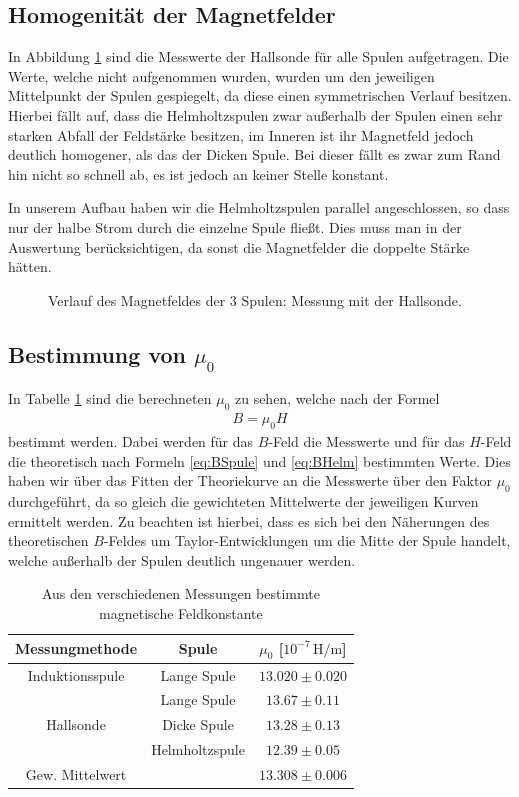 \documentclass[12pt,a4paper,titlepage,headinclude,bibtotoc]{scrartcl}
\begin{document}
\subsection{Homogenität der Magnetfelder}
In Abbildung \ref{fig:Homogen} sind die Messwerte der Hallsonde für alle Spulen aufgetragen.
Die Werte, welche nicht aufgenommen wurden, wurden um den jeweiligen Mittelpunkt der Spulen gespiegelt, da diese einen symmetrischen Verlauf besitzen.
Hierbei fällt auf, dass die Helmholtzspulen zwar außerhalb der Spulen einen sehr starken Abfall der Feldstärke besitzen, im Inneren ist ihr Magnetfeld jedoch deutlich homogener, als das der Dicken Spule.
Bei dieser fällt es zwar zum Rand hin nicht so schnell ab, es ist jedoch an keiner Stelle konstant.

In unserem Aufbau haben wir die Helmholtzspulen parallel angeschlossen, so dass nur der halbe Strom durch die einzelne Spule fließt.
Dies muss man in der Auswertung berücksichtigen, da sonst die Magnetfelder die doppelte Stärke hätten.

\begin{figure}[!htb]
	\centering
	
	\caption{Verlauf des Magnetfeldes der 3 Spulen: Messung mit der Hallsonde.}
	\label{fig:Homogen}
\end{figure}

\subsection{Bestimmung von $\mu_0$}
In Tabelle \ref{tab:mu} sind die berechneten $\mu_0$ zu sehen, welche nach der Formel
\begin{align*}
	B=\mu_0 H
\end{align*}
bestimmt werden.
Dabei werden für das $B$-Feld die Messwerte und für das $H$-Feld die theoretisch nach Formeln \eqref{eq:BSpule} und \eqref{eq:BHelm} bestimmten Werte.
Dies haben wir über das Fitten der Theoriekurve an die Messwerte über den Faktor $\mu_0$ durchgeführt, da so gleich die gewichteten Mittelwerte der jeweiligen Kurven ermittelt werden.
Zu beachten ist hierbei, dass es sich bei den Näherungen des theoretischen $B$-Feldes um Taylor-Entwicklungen um die Mitte der Spule handelt, welche außerhalb der Spulen deutlich ungenauer werden.

\begin{table}[!htb]
	\centering
	\begin{tabular}{|c|c|c|}
	\hline
	Messungmethode & Spule & $\mu_0$ [$10^{-7}\,\si{\henry\per\meter}$]\\
	\hline
	\hline
	Induktionsspule & Lange Spule & $13.020 \pm 0.020$\\
	\hline
	          & Lange Spule & $13.67 \pm 0.11$ \\
	Hallsonde & Dicke Spule & $13.28 \pm 0.13$ \\
	          & Helmholtzspule & $12.39 \pm 0.05$ \\
	\hline\hline
	Gew. Mittelwert	& & $13.308\pm 0.006$ \\\hline
	\end{tabular}
	\caption{Aus den verschiedenen Messungen bestimmte magnetische Feldkonstante}
	\label{tab:mu}
\end{table}
\end{document}
